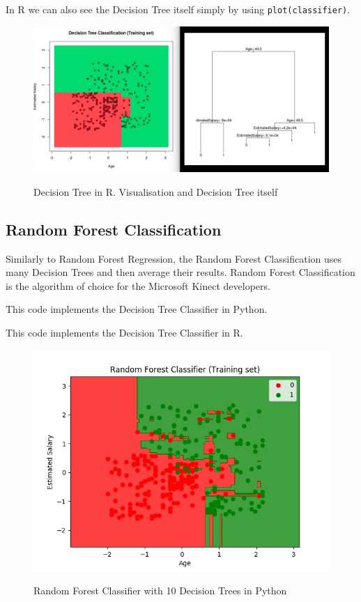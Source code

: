 \documentclass[runningheads,a4paper]{llncs}
\begin{document}
In R we can also see the Decision Tree itself simply by using \verb|plot(classifier)|. 

\begin{figure}[H]
\centering
\begin{center}
\includegraphics[scale=0.33]{pics/dtr}
\label{uloha1:pic1}
\caption{Decision Tree in R. Visualisation and Decision Tree itself} 
\end{center}
\end{figure}

\subsection{Random Forest Classification}

Similarly to Random Forest Regression, the Random Forest Classification uses many Decision Trees and then average their results. Random Forest Classification is the algorithm of choice for the Microsoft Kinect developers.

This code implements the Decision Tree Classifier in Python.
 


This code implements the Decision Tree Classifier in R.
 

\begin{figure}[H]
\centering
\begin{center}
\includegraphics[scale=0.8]{pics/rfc}
\label{uloha1:pic1}
\caption{Random Forest Classifier with 10 Decision Trees in Python} 
\end{center}
\end{figure}
\end{document}
